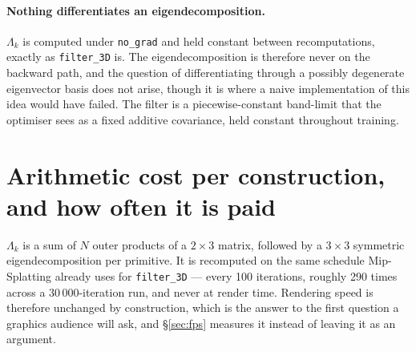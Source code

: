 \paragraph{Nothing differentiates an eigendecomposition.} $\Lambda_k$ is
computed under \texttt{no\_grad} and held constant between recomputations,
exactly as \texttt{filter\_3D} is. The eigendecomposition is therefore never on
the backward path, and the question of differentiating through a possibly
degenerate eigenvector basis does not arise, though it is where a naive implementation of
this idea would have failed. The filter is a piecewise-constant
band-limit that the optimiser sees as a fixed additive covariance, held constant throughout
training.

\section{Arithmetic cost per construction, and how often it is paid}
$\Lambda_k$ is a sum of $N$ outer products of a $2\times3$ matrix, followed by a
$3\times3$ symmetric eigendecomposition per primitive. It is recomputed on the
same schedule Mip-Splatting already uses for \texttt{filter\_3D} --- every 100
iterations, roughly 290 times across a 30\,000-iteration run, and never at
render time. Rendering speed is therefore unchanged by construction, which is
the answer to the first question a graphics audience will ask, and \S\ref{sec:fps} measures it instead of leaving it as an argument.
